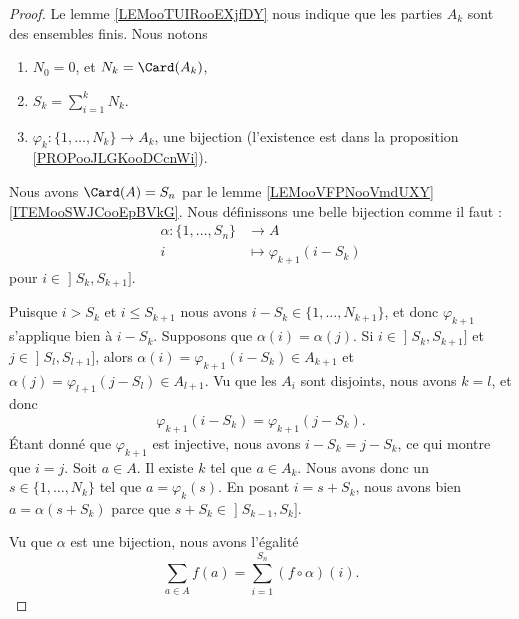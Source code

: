 \begin{proof}
	Le lemme \ref{LEMooTUIRooEXjfDY} nous indique que les parties \( A_k\) sont des ensembles finis. Nous notons
	\begin{enumerate}
		\item
		      \( N_0=0\), et \( N_k=\Card(A_k)\),
		\item
		      \( S_k=\sum_{i=1}^kN_k\).
		\item
		      \( \varphi_k\colon \{ 1,\ldots, N_k \}\to A_k\), une bijection (l'existence est dans la proposition \ref{PROPooJLGKooDCcnWi}).
	\end{enumerate}
	Nous avons \( \Card(A)=S_n\) par le lemme \ref{LEMooVFPNooVmdUXY}\ref{ITEMooSWJCooEpBVkG}. Nous définissons une belle bijection comme il faut :
	\begin{equation}
		\begin{aligned}
			\alpha\colon \{ 1,\ldots, S_n \} & \to A                        \\
			i                                & \mapsto \varphi_{k+1}(i-S_k)
		\end{aligned}
	\end{equation}
	pour \( i\in\mathopen] S_k , S_{k+1} \mathclose]\).

	\begin{subproof}
		Puisque \( i>S_k\) et \( i\leq S_{k+1}\) nous avons \( i-S_k\in \{ 1,\ldots, N_{k+1} \}\), et donc \( \varphi_{k+1}\) s'applique bien à \( i-S_k\).
		Supposons que \( \alpha(i)=\alpha(j)\). Si \( i\in \mathopen] S_k , S_{k+1} \mathclose]\) et \( j\in \mathopen] S_l , S_{l+1} \mathclose]\), alors \( \alpha(i)=\varphi_{k+1}(i-S_k)\in A_{k+1}\) et \( \alpha(j)=\varphi_{l+1}(j-S_l)\in A_{l+1}\). Vu que les \( A_i\) sont disjoints, nous avons \( k=l\), et donc
		\begin{equation}
			\varphi_{k+1}(i-S_k)=\varphi_{k+1}(j-S_k).
		\end{equation}
		Étant donné que \( \varphi_{k+1}\) est injective, nous avons \( i-S_k=j-S_k\), ce qui montre que \( i=j\).
		Soit \( a\in A\). Il existe \( k\) tel que \( a\in A_k\). Nous avons donc un \( s\in\{ 1,\ldots, N_k \}\) tel que \( a=\varphi_k(s)\). En posant \( i=s+S_k\), nous avons bien \( a=\alpha(s+S_k)\) parce que \( s+S_k\in \mathopen] S_{k-1} , S_k \mathclose]\).
	\end{subproof}
	Vu que \( \alpha\) est une bijection, nous avons l'égalité
	\begin{equation}
		\sum_{a\in A}f(a)=\sum_{i=1}^{S_n}(f\circ \alpha)(i).
	\end{equation}


\end{proof}

